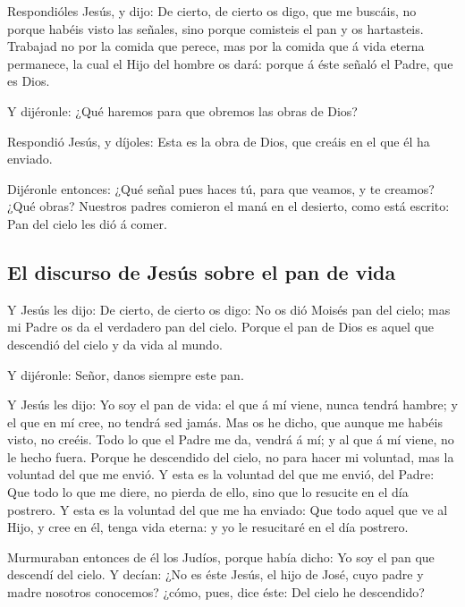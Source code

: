  Respondióles Jesús, y dijo: De cierto, de cierto os digo,
que me buscáis, no porque habéis visto las señales, sino porque
comisteis el pan y os hartasteis.  Trabajad no por la
comida que perece, mas por la comida que á vida eterna permanece, la
cual el Hijo del hombre os dará: porque á éste señaló el Padre, que es
Dios.

 Y dijéronle: ¿Qué haremos para que obremos las obras de
Dios?

 Respondió Jesús, y díjoles: Esta es la obra de Dios, que
creáis en el que él ha enviado.

 Dijéronle entonces: ¿Qué señal pues haces tú, para que
veamos, y te creamos? ¿Qué obras?  Nuestros padres comieron
el maná en el desierto, como está escrito: Pan del cielo les dió á
comer.

\hypertarget{el-discurso-de-jesuxfas-sobre-el-pan-de-vida}{%
\subsection{El discurso de Jesús sobre el pan de
vida}\label{el-discurso-de-jesuxfas-sobre-el-pan-de-vida}}

 Y Jesús les dijo: De cierto, de cierto os digo: No os dió
Moisés pan del cielo; mas mi Padre os da el verdadero pan del cielo.
 Porque el pan de Dios es aquel que descendió del cielo y
da vida al mundo.

 Y dijéronle: Señor, danos siempre este pan.

 Y Jesús les dijo: Yo soy el pan de vida: el que á mí
viene, nunca tendrá hambre; y el que en mí cree, no tendrá sed jamás.
 Mas os he dicho, que aunque me habéis visto, no creéis.
 Todo lo que el Padre me da, vendrá á mí; y al que á mí
viene, no le hecho fuera.  Porque he descendido del cielo,
no para hacer mi voluntad, mas la voluntad del que me envió.
 Y esta es la voluntad del que me envió, del Padre: Que
todo lo que me diere, no pierda de ello, sino que lo resucite en el día
postrero.  Y esta es la voluntad del que me ha enviado: Que
todo aquel que ve al Hijo, y cree en él, tenga vida eterna: y yo le
resucitaré en el día postrero.

 Murmuraban entonces de él los Judíos, porque había dicho:
Yo soy el pan que descendí del cielo.  Y decían: ¿No es
éste Jesús, el hijo de José, cuyo padre y madre nosotros conocemos?
¿cómo, pues, dice éste: Del cielo he descendido?


